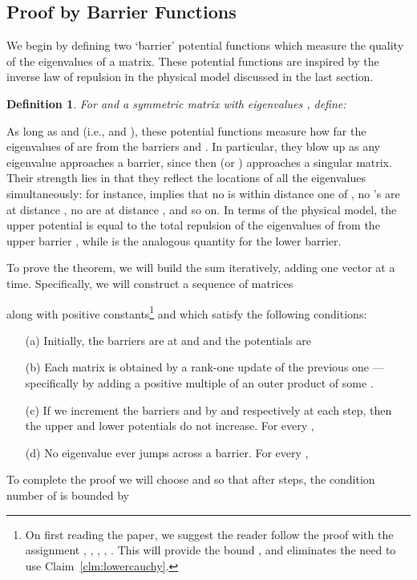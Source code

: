 \documentclass[12pt]{article}
\newtheorem{definition}[theorem]{Definition}
\begin{document}
\subsection{Proof by Barrier Functions}
We begin by defining two `barrier' potential
  functions which measure the quality of the eigenvalues of a matrix. 
These potential functions are inspired by the inverse law 
  of repulsion in the physical model discussed in the last section.
\begin{definition}
For  and  a symmetric matrix with eigenvalues
, define:
 

\end{definition}

As long as  and  (i.e.,  and ), these potential functions
  measure how far the eigenvalues of  are from the barriers  and . 
In particular, they blow up as any eigenvalue approaches a
  barrier, since then  (or ) approaches a singular matrix.
Their strength lies in that they reflect the locations of all the
  eigenvalues simultaneously: for instance, 
   implies that
  no  is within distance one of , no 
  's are at distance , no  are at distance , and so on.
In terms of the physical model, the upper potential  is equal to the total repulsion of the eigenvalues of
   from the upper barrier , while  is the analogous quantity for the lower barrier.

To prove the theorem, we will build the sum  iteratively, adding one vector at a time.
Specifically, we will construct a sequence of matrices 

along with positive constants\footnote{On first reading the paper, we suggest the reader follow the proof with
  the assignment , ,
  , , .
  This will provide the bound , and eliminates
  the need to use Claim~\ref{clm:lowercauchy}.
}
  and  which satisfy the following conditions:
\begin{enumerate}
\item [(a)] Initially, the barriers are at  and  and the potentials are 

\item [(b)] Each matrix is obtained by a rank-one update of the previous one ---
specifically by adding a positive multiple of an outer product of some .

\item [(c)] If we increment the barriers  and  by  and  respectively
at each step, then the upper and lower potentials do not increase. For every
,


\item [(d)] No eigenvalue ever jumps across a barrier. For every ,

\end{enumerate}
To complete the proof
 we will choose
  and  so that
after  steps, the condition number of  is bounded by
\end{document}

